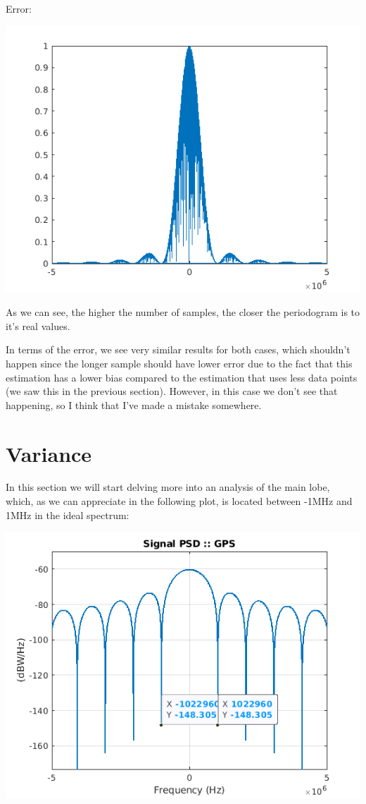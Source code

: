 \documentclass[conference,9pt]{IEEEtran}
\begin{document}
Error:

\includegraphics[scale=0.6]{error500.png}

As we can see, the higher the number of samples, the closer the periodogram is to it's real values.

In terms of the error, we see very similar results for both cases, which shouldn't happen since the longer sample should have lower error due to the fact that this estimation has a lower bias compared to the estimation that uses less data points (we saw this in the previous section). However, in this case we don't see that happening, so I think that I've made a mistake somewhere.

\section{Variance}
In this section we will start delving more into an analysis of the main lobe, which, as we can appreciate in the following plot, is located between -1MHz and 1MHz in the ideal spectrum:

\includegraphics[scale=0.6]{mainlobe.png}
\end{document}
